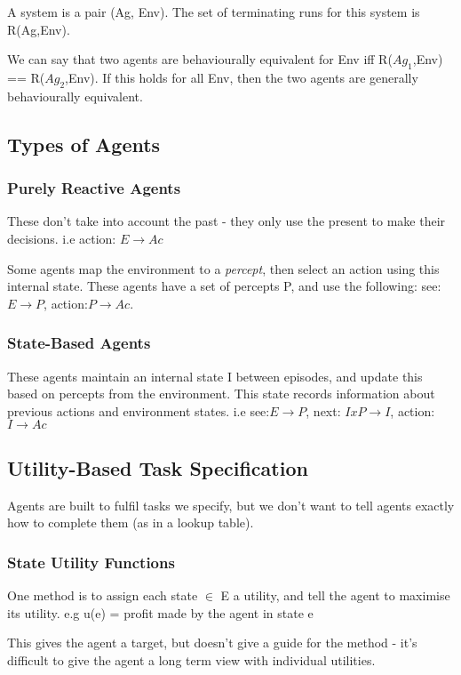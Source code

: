 A system is a pair (Ag, Env). The set of terminating runs for this system is R(Ag,Env). 

We can say that two agents are behaviourally equivalent for Env iff R($Ag_1$,Env) == R($Ag_2$,Env). If this holds for all Env, then the two agents are generally behaviourally equivalent. 

\subsection{Types of Agents}

\subsubsection{Purely Reactive Agents}
These don't take into account the past - they only use the present to make their decisions. i.e action: $E\rightarrow Ac$

Some agents map the environment to a \emph{percept}, then select an action using this internal state. These agents have a set of percepts P, and use the following: 
    see:$E\rightarrow P$, action:$P\rightarrow Ac$. 

\subsubsection{State-Based Agents}
These agents maintain an internal state I between episodes, and update this based on percepts from the environment. This state records information about previous actions and environment states.  i.e see:$E\rightarrow P$, next: $IxP\rightarrow I$, action:$I \rightarrow Ac$

\subsection{Utility-Based Task Specification}
Agents are built to fulfil tasks we specify, but we don't want to tell agents exactly how to complete them (as in a lookup table). 

\subsubsection{State Utility Functions}
One method is to assign each state $\in$ E a utility, and tell the agent to maximise its utility. e.g u(e) = profit made by the agent in state e

This gives the agent a target, but doesn't give a guide for the method - it's difficult to give the agent a long term view with individual utilities.

